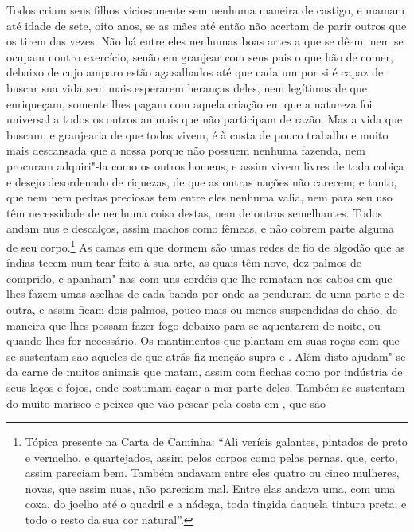  Todos criam seus filhos viciosamente sem nenhuma maneira de castigo, e			%
mamam até idade de sete, oito anos, se as mães até então não acertam de
parir outros que os tirem das vezes. Não há entre eles nenhumas boas
artes a que se dêem, nem se ocupam noutro exercício, senão em granjear
com seus pais o que hão de comer, debaixo de cujo amparo estão
agasalhados até que cada um por si é capaz de buscar sua vida sem mais
esperarem heranças deles, nem legítimas de que enriqueçam, somente lhes
pagam com aquela criação em que a natureza foi universal a todos os
outros animais que não participam de razão. Mas a vida que buscam, e
granjearia de que todos vivem, é à custa de pouco trabalho e muito mais descansada que a nossa porque não possuem nenhuma fazenda, nem procuram adquiri"-la como os outros homens, e assim vivem livres de toda cobiça e desejo
desordenado de riquezas, de que as outras nações não carecem; e tanto,
que  nem  nem pedras preciosas tem entre eles nenhuma valia,		%
nem para seu uso têm necessidade de nenhuma coisa destas, nem de outras
semelhantes. Todos andam nus e descalços, assim machos como fêmeas, e
não cobrem parte alguma de seu corpo.\footnote{ Tópica presente 
na Carta de Caminha: ``Ali veríeis galantes, pintados de
preto e vermelho, e quartejados, assim pelos corpos como pelas pernas, que,
certo, assim pareciam bem. Também andavam entre eles quatro ou cinco mulheres,
novas, que assim nuas, não pareciam mal. Entre elas andava uma, com uma coxa, do
joelho até o quadril e a nádega, toda tingida daquela tintura preta; e todo o
resto da sua cor natural''.} 
As camas em que dormem são umas
redes de fio de algodão que as índias tecem num tear feito à sua arte, as		%
quais têm nove, dez palmos de comprido, e apanham"-nas com uns cordéis
que lhe rematam nos cabos em que lhes fazem umas aselhas
de cada banda por onde as penduram de uma parte e de outra, e assim
ficam dois palmos, pouco mais ou menos suspendidas do chão, de maneira
que lhes possam fazer fogo debaixo para se aquentarem de noite, ou
quando lhes for necessário. Os mantimentos que plantam em suas roças			%
com que se sustentam são aqueles de que atrás fiz menção supra
 e . Além disto ajudam"-se da carne de muitos	%
animais que matam, assim com flechas como por indústria de seus laços e
fojos, onde costumam caçar a mor parte deles. Também se sustentam do
muito marisco e peixes que vão pescar pela costa em , que são		%
